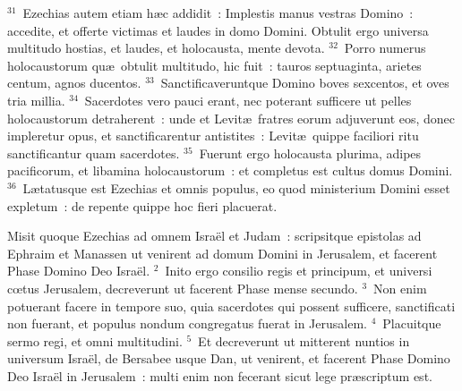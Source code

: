 ${}^{31}$~Ezechias autem etiam h\ae c addidit~: Implestis manus vestras Domino~: accedite, et offerte victimas et laudes in domo Domini. Obtulit ergo universa multitudo hostias, et laudes, et holocausta, mente devota.
${}^{32}$~Porro numerus holocaustorum qu\ae\ obtulit multitudo, hic fuit~: tauros septuaginta, arietes centum, agnos ducentos.
${}^{33}$~Sanctificaveruntque Domino boves sexcentos, et oves tria millia.
${}^{34}$~Sacerdotes vero pauci erant, nec poterant sufficere ut pelles holocaustorum detraherent~: unde et Levit\ae\ fratres eorum adjuverunt eos, donec impleretur opus, et sanctificarentur antistites~: Levit\ae\ quippe faciliori ritu sanctificantur quam sacerdotes.
${}^{35}$~Fuerunt ergo holocausta plurima, adipes pacificorum, et libamina holocaustorum~: et completus est cultus domus Domini.
${}^{36}$~L\ae tatusque est Ezechias et omnis populus, eo quod ministerium Domini esset expletum~: de repente quippe hoc fieri placuerat.

\lettrine[lines=10,image=true,loversize=0.05,lraise=-0.03]{M}{}isit quoque Ezechias ad omnem Isra\"el et Judam~: scripsitque epistolas ad Ephraim et Manassen ut venirent ad domum Domini in Jerusalem, et facerent Phase Domino Deo Isra\"el.
${}^{2}$~Inito ergo consilio regis et principum, et universi cœtus Jerusalem, decreverunt ut facerent Phase mense secundo.
${}^{3}$~Non enim potuerant facere in tempore suo, quia sacerdotes qui possent sufficere, sanctificati non fuerant, et populus nondum congregatus fuerat in Jerusalem.
${}^{4}$~Placuitque sermo regi, et omni multitudini.
${}^{5}$~Et decreverunt ut mitterent nuntios in universum Isra\"el, de Bersabee usque Dan, ut venirent, et facerent Phase Domino Deo Isra\"el in Jerusalem~: multi enim non fecerant sicut lege pr\ae scriptum est.


